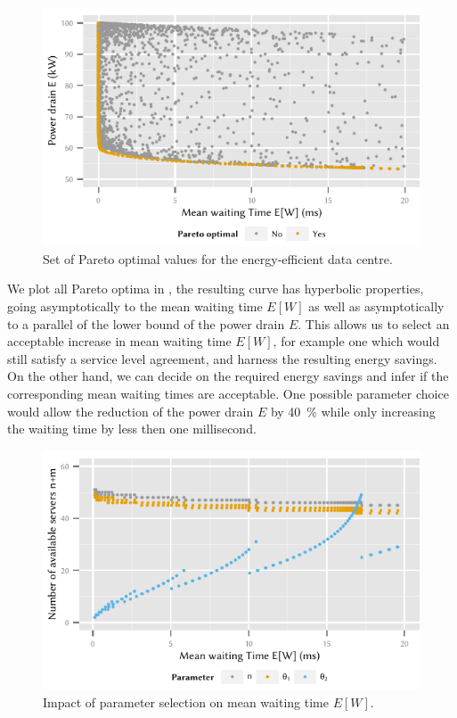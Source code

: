 \begin{figure}
  \centering
  \includegraphics{cloud/data_centers/performance_evaluation/figures/energy_vs_waiting_pareto}
  \caption{Set of Pareto optimal values for the energy-efficient data centre.}
  \label{fig:cloud:data_centers:performance_evaluation:energy_vs_waiting_pareto}
\end{figure}

We plot all Pareto optima in , the resulting curve has hyperbolic properties, going asymptotically to the mean waiting time \(E[W]\) as well as asymptotically to a parallel of the lower bound of the power drain \(E\).
This allows us to select an acceptable increase in mean waiting time \(E[W]\), for example one which would still satisfy a service level agreement, and harness the resulting energy savings.
On the other hand, we can decide on the required energy savings and infer if the corresponding mean waiting times are acceptable.
One possible parameter choice would allow the reduction of the power drain \(E\) by \SI{40}{\percent} while only increasing the waiting time by less then one millisecond.

\begin{figure}
  \centering
  \includegraphics{cloud/data_centers/performance_evaluation/figures/sorted_results}
  \caption{Impact of parameter selection on mean waiting time \(E[W]\).}
  \label{fig:cloud:data_centers:performance_evaluation:sorted_results}
\end{figure}

